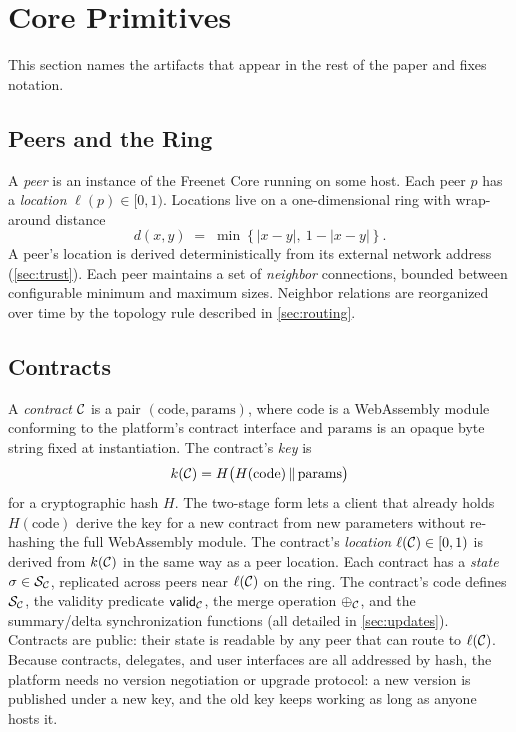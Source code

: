 \section{Core Primitives}
\label{sec:primitives}

This section names the artifacts that appear in the rest of the paper and fixes notation.

\subsection{Peers and the Ring}

A \emph{peer} is an instance of the Freenet Core running on some host. Each peer $p$ has a \emph{location} $\ell(p) \in [0, 1)$. Locations live on a one-dimensional ring with wrap-around distance
\[
  d(x, y) \;=\; \min\!\left\{|x - y|,\ 1 - |x - y|\right\}.
\]
A peer's location is derived deterministically from its external network address (\cref{sec:trust}). Each peer maintains a set of \emph{neighbor} connections, bounded between configurable minimum and maximum sizes. Neighbor relations are reorganized over time by the topology rule described in \cref{sec:routing}.

\subsection{Contracts}

A \emph{contract} $\mathcal{C}$ is a pair $(\mathrm{code}, \mathrm{params})$, where $\mathrm{code}$ is a WebAssembly module conforming to the platform's contract interface and $\mathrm{params}$ is an opaque byte string fixed at instantiation. The contract's \emph{key} is
\[
  k(\mathcal{C}) = H\bigl(H(\mathrm{code}) \,\|\, \mathrm{params}\bigr)
\]
for a cryptographic hash $H$. The two-stage form lets a client that already holds $H(\mathrm{code})$ derive the key for a new contract from new parameters without re-hashing the full WebAssembly module. The contract's \emph{location} $\ell(\mathcal{C}) \in [0, 1)$ is derived from $k(\mathcal{C})$ in the same way as a peer location. Each contract has a \emph{state} $\sigma \in \mathcal{S}_{\mathcal{C}}$, replicated across peers near $\ell(\mathcal{C})$ on the ring. The contract's code defines $\mathcal{S}_{\mathcal{C}}$, the validity predicate $\mathsf{valid}_{\mathcal{C}}$, the merge operation $\oplus_{\mathcal{C}}$, and the summary/delta synchronization functions (all detailed in \cref{sec:updates}). Contracts are public: their state is readable by any peer that can route to $\ell(\mathcal{C})$. Because contracts, delegates, and user interfaces are all addressed by hash, the platform needs no version negotiation or upgrade protocol: a new version is published under a new key, and the old key keeps working as long as anyone hosts it.

